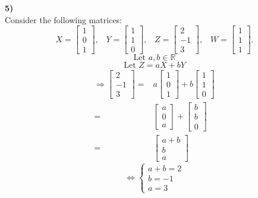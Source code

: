 \documentclass{article}
\newcommand{\R}{\mathbb{R}} %
\begin{document}
\noindent\textbf{5)}\vspace{3mm}\\ 
Consider the following matrices: 
\[ X = \begin{bmatrix}
1 \\ 0 \\ 1
\end{bmatrix},  \; \; \; Y = \begin{bmatrix}
1 \\ 1 \\ 0
\end{bmatrix},  \; \; \; Z = \begin{bmatrix}
2 \\ -1 \\ 3
\end{bmatrix},  \; \; \; W = \begin{bmatrix}
1 \\ 1 \\ 1
\end{bmatrix}. \] 
\vspace{3mm}
$$\text{Let }a,b\in\R$$
$$\text{Let }Z=aX+bY$$
\begin{align*}
\Rightarrow\begin{bmatrix}2\\-1\\3\end{bmatrix}=&a\begin{bmatrix}1\\0\\1\end{bmatrix}+b\begin{bmatrix}1\\1\\0\end{bmatrix}\\
=&\begin{bmatrix}a\\0\\a\end{bmatrix}+\begin{bmatrix}b\\b\\0\end{bmatrix}\\
=&\begin{bmatrix}a+b\\b\\a\end{bmatrix}
\end{align*}
$$\Longleftrightarrow\left\{
\begin{array}{c}
	a+b=2\\
	b=-1\\
	a=3
\end{array}
\right. $$
\end{document}
